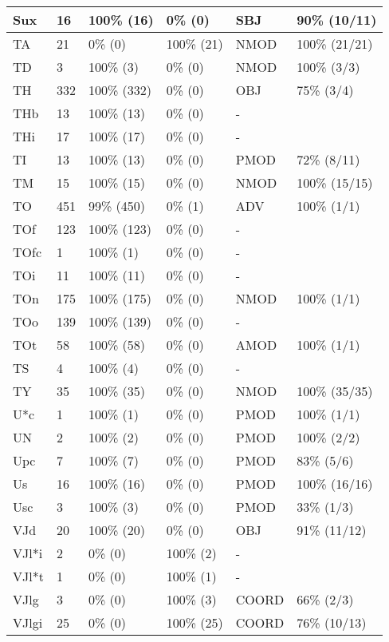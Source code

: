 \begin{figure*}
\begin{tabular}{|l|l|l|l||l|l|}
\hline
 Sux & 16 & 100\% (16) & 0\% (0) & SBJ & 90\% (10/11) \\ 
\hline
 TA & 21 & 0\% (0) & 100\% (21) & NMOD & 100\% (21/21) \\ 
\hline
 TD & 3 & 100\% (3) & 0\% (0) & NMOD & 100\% (3/3) \\ 
\hline
 TH & 332 & 100\% (332) & 0\% (0) & OBJ & 75\% (3/4) \\ 
\hline
 THb & 13 & 100\% (13) & 0\% (0) & - &  \\ 
\hline
 THi & 17 & 100\% (17) & 0\% (0) & - &  \\ 
\hline
 TI & 13 & 100\% (13) & 0\% (0) & PMOD & 72\% (8/11) \\ 
\hline
 TM & 15 & 100\% (15) & 0\% (0) & NMOD & 100\% (15/15) \\ 
\hline
 TO & 451 & 99\% (450) & 0\% (1) & ADV & 100\% (1/1) \\ 
\hline
 TOf & 123 & 100\% (123) & 0\% (0) & - &  \\ 
\hline
 TOfc & 1 & 100\% (1) & 0\% (0) & - &  \\ 
\hline
 TOi & 11 & 100\% (11) & 0\% (0) & - &  \\ 
\hline
 TOn & 175 & 100\% (175) & 0\% (0) & NMOD & 100\% (1/1) \\ 
\hline
 TOo & 139 & 100\% (139) & 0\% (0) & - &  \\ 
\hline
 TOt & 58 & 100\% (58) & 0\% (0) & AMOD & 100\% (1/1) \\ 
\hline
 TS & 4 & 100\% (4) & 0\% (0) & - &  \\ 
\hline
 TY & 35 & 100\% (35) & 0\% (0) & NMOD & 100\% (35/35) \\ 
\hline
 U*c & 1 & 100\% (1) & 0\% (0) & PMOD & 100\% (1/1) \\ 
\hline
 UN & 2 & 100\% (2) & 0\% (0) & PMOD & 100\% (2/2) \\ 
\hline
 Upc & 7 & 100\% (7) & 0\% (0) & PMOD & 83\% (5/6) \\ 
\hline
 Us & 16 & 100\% (16) & 0\% (0) & PMOD & 100\% (16/16) \\ 
\hline
 Usc & 3 & 100\% (3) & 0\% (0) & PMOD & 33\% (1/3) \\ 
\hline
 VJd & 20 & 100\% (20) & 0\% (0) & OBJ & 91\% (11/12) \\ 
\hline
 VJl*i & 2 & 0\% (0) & 100\% (2) & - &  \\ 
\hline
 VJl*t & 1 & 0\% (0) & 100\% (1) & - &  \\ 
\hline
 VJlg & 3 & 0\% (0) & 100\% (3) & COORD & 66\% (2/3) \\ 
\hline
 VJlgi & 25 & 0\% (0) & 100\% (25) & COORD & 76\% (10/13) \\ 
\hline
\end{tabular}
\end{figure*}
